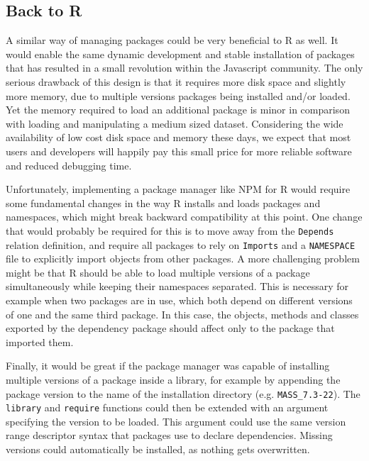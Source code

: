 \subsection{Back to R}

A similar way of managing packages could be very beneficial to R as well. It would
enable the same dynamic development and stable installation of packages that has
resulted in a small revolution within the Javascript community. The only serious
drawback of this design is that it requires more disk space and slightly
more memory, due to multiple versions packages being installed and/or loaded.
Yet the memory required to load an additional package is minor in comparison
with loading and manipulating a medium sized dataset. Considering the wide
availability of low cost disk space and memory these days, we expect that most
users and developers will happily pay this small price for more reliable
software and reduced debugging time. 

Unfortunately, implementing a package manager like NPM for R would require some
fundamental changes in the way R installs and loads packages and namespaces,
which might break backward compatibility at this point. One change that would
probably be required for this is to move away from the \texttt{Depends}
relation definition, and require all packages to rely on \texttt{Imports} and a
\texttt{NAMESPACE} file to explicitly import objects from other packages. A
more challenging problem might be that R should be able to load multiple
versions of a package simultaneously while keeping their namespaces separated.
This is necessary for example when two packages are in use, which
both depend on different versions of one and the same third package. In this
case, the objects, methods and classes exported by the dependency package
should affect only to the package that imported them.

Finally, it would be great if the package manager was capable of installing
multiple versions of a package inside a library, for example by appending
the package version to the name of the installation directory (e.g. \texttt{MASS\_7.3-22}).
The \texttt{library} and \texttt{require} functions could then be extended with
an argument specifying the version to be loaded. This argument could use the
same version range descriptor syntax that packages use to declare dependencies.
Missing versions could automatically be installed, as nothing gets overwritten.

\begin{knitrout}\mycodesize
{}\color{fgcolor}\begin{kframe}
\begin{alltt}
  \hlstd{=} \hlstd{)}
  \hlstd{=} \hlstd{)}
  \hlstd{=} \hlstd{)}
\end{alltt}
\end{kframe}
\end{knitrout}


